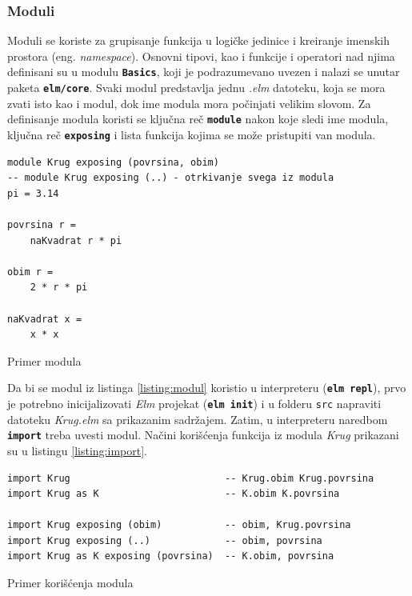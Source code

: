 \documentclass[12pt,oneside]{memoir}
\begin{document}
\subsubsection{Moduli}
Moduli se koriste za grupisanje funkcija u logičke jedinice i kreiranje imenskih 
prostora (eng. \emph{namespace}). Osnovni tipovi, kao i funkcije i operatori nad njima 
definisani su u modulu \texttt{\textbf{Basics}}, koji je podrazumevano uvezen i nalazi se 
unutar paketa \texttt{\textbf{elm/core}}. Svaki modul predstavlja jednu \emph{.elm} datoteku,
koja se mora zvati isto kao i modul, dok ime modula mora počinjati velikim slovom.
Za definisanje modula koristi se ključna reč \texttt{\textbf{module}} nakon koje sledi
ime modula, ključna reč \texttt{\textbf{exposing}} i lista funkcija kojima se može 
pristupiti van modula.
\begin{listing}[h]
\begin{verbatim}
module Krug exposing (povrsina, obim) 
-- module Krug exposing (..) - otrkivanje svega iz modula 
pi = 3.14

povrsina r =
    naKvadrat r * pi

obim r =
    2 * r * pi

naKvadrat x =
    x * x
\end{verbatim}
\caption{Primer modula}
\label{listing:modul}
\end{listing}

Da bi se modul iz listinga \ref{listing:modul} koristio u interpreteru (\texttt{\textbf{elm repl}}),
prvo je potrebno inicijalizovati \emph{Elm} projekat (\texttt{\textbf{elm init}}) i u folderu \texttt{src} napraviti 
datoteku \emph{Krug.elm} sa prikazanim sadržajem. Zatim, u interpreteru naredbom 
\texttt{\textbf{import}} treba uvesti modul. Načini korišćenja funkcija iz modula
\emph{Krug} prikazani su u listingu \ref{listing:import}.
\begin{listing}[h]
\begin{verbatim}
import Krug                           -- Krug.obim Krug.povrsina
import Krug as K                      -- K.obim K.povrsina

import Krug exposing (obim)           -- obim, Krug.povrsina
import Krug exposing (..)             -- obim, povrsina
import Krug as K exposing (povrsina)  -- K.obim, povrsina
\end{verbatim}
\caption{Primer korišćenja modula}
\label{listing:import}
\end{listing}
\end{document}
